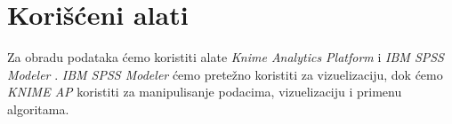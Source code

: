 \section{Kori\v{s}\'c{}eni alati}
\label{sec:Alati}

Za obradu podataka \'c{}emo koristiti alate \emph{Knime Analytics Platform} \cite{KNIME} i \emph{IBM SPSS Modeler} \cite{SPSS}. \emph{IBM SPSS Modeler} \'c{}emo prete\v{z}no koristiti za vizuelizaciju, dok \'c{}emo \emph{KNIME AP} koristiti za manipulisanje podacima, vizuelizaciju i primenu algoritama.
